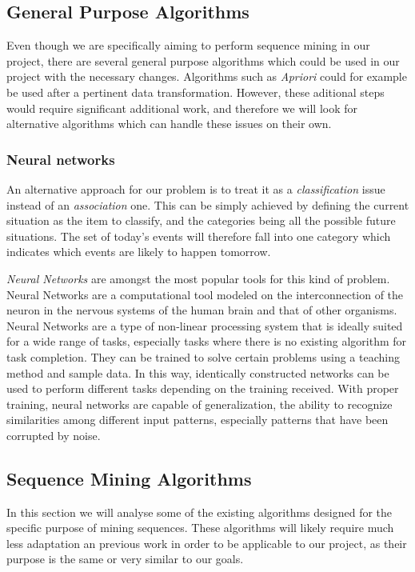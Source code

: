 \subsection{General Purpose Algorithms}

Even though we are specifically aiming to perform sequence mining in our project, there are several general purpose algorithms which could be used in our project with the necessary changes. Algorithms such as \emph{Apriori}\cite{kumar2010implementation} could for example be used after a pertinent data transformation. However, these aditional steps would require significant additional work, and therefore we will look for alternative algorithms which can handle these issues on their own.

\subsubsection{Neural networks}
An alternative approach for our problem is to treat it as a \emph{classification} issue instead of an \emph{association} one. This can be simply achieved by defining the current situation as the item to classify, and the categories being all the possible future situations. The set of today's events will therefore fall into one category which indicates which events are likely to happen tomorrow.

\emph{Neural Networks}\cite{rojas1996neural} are amongst the most popular tools for this kind of problem. Neural Networks are a computational tool modeled on the interconnection of the neuron in the nervous systems of the human brain and that of other organisms. Neural Networks are a type of non-linear processing system that is ideally suited for a wide range of tasks, especially tasks where there is no existing algorithm for task completion. They can be trained to solve certain problems using a teaching method and sample data. In this way, identically constructed networks can be used to perform different tasks depending on the training received. With proper training, neural networks are capable of generalization, the ability to recognize similarities among different input patterns, especially patterns that have been corrupted by noise.

\subsection{Sequence Mining Algorithms}
In this section we will analyse some of the existing algorithms designed for the specific purpose of mining sequences. These algorithms will likely require much less adaptation an previous work in order to be applicable to our project, as their purpose is the same or very similar to our goals.

